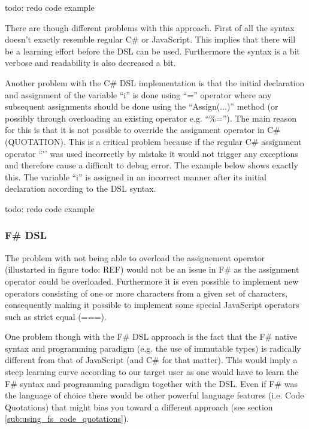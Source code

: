 			todo: redo code example

			There are though different problems with this approach. First of all the syntax doesn’t exactly resemble regular C\# or JavaScript. This implies that there will be a learning effort before the DSL can be used. Furthermore the syntax is a bit verbose and readability is also decreased a bit.

			Another problem with the C\# DSL implementation is that the initial declaration and assignment of the variable ``i'' is done using ``='' operator where any subsequent assignments should be done using the ``Assign(...)'' method (or possibly through overloading an existing operator e.g. ``\%=''). The main reason for this is that it is not possible to override the assignment operator in C\# (QUOTATION). This is a critical problem because if the regular C\# assignment operator ``\='' was used incorrectly by mistake it would not trigger any exceptions and therefore cause a difficult to debug error.  The example below shows exactly this. The variable ``i'' is assigned in an incorrect manner after its initial declaration according to the DSL syntax.

			todo: redo code example
		

		\subsubsection{F\# DSL} %
		\label{sub:fs_dsl}

			The problem with not being able to overload the assignement operator (illustarted in figure todo: REF) would not be an issue in F\# as the assignment operator could be overloaded. Furthermore it is even possible to implement new operators consisting of one or more characters from a given set of characters, consequently making it possible to implement some special JavaScript operators such as strict equal (===).

			One problem though with the F\# DSL approach is the fact that the F\# native syntax and programming paradigm (e.g. the use of immutable types) is radically different from that of JavaScript (and C\# for that matter). This would imply a steep learning curve according to our target user as one would have to learn the F\# syntax and programming paradigm together with the DSL. Even if F\# was the language of choice there would be other powerful language features (i.e. Code Quotations) that might bias you toward a different approach (see section \ref{sub:using_fs_code_quotations}).

